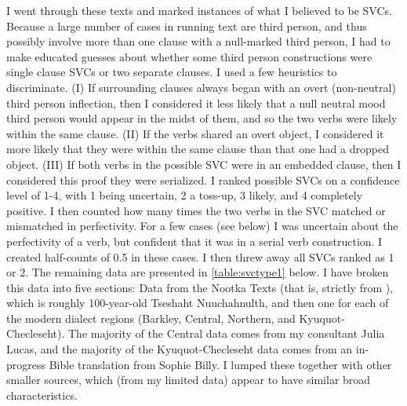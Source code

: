 I went through these texts and marked instances of what I believed to be SVCs. Because a large number of cases in running text are third person, and thus possibly involve more than one clause with a null-marked third person, I had to make educated guesses about whether some third person constructions were single clause SVCs or two separate clauses. I used a few heuristics to discriminate. (I) If surrounding clauses always began with an overt (non-neutral) third person inflection, then I considered it less likely that a null neutral mood third person would appear in the midst of them, and so the two verbs were likely within the same clause. (II) If the verbs shared an overt object, I considered it more likely that they were within the same clause than that one had a dropped object. (III) If both verbs in the possible SVC were in an embedded clause, then I considered this proof they were serialized. I ranked possible SVCs on a confidence level of 1-4, with 1 being uncertain, 2 a toss-up, 3 likely, and 4 completely positive. I then counted how many times the two verbs in the SVC matched or mismatched in perfectivity. For a few cases (see below) I was uncertain about the perfectivity of a verb, but confident that it was in a serial verb construction. I created half-counts of 0.5 in these cases. I then threw away all SVCs ranked as 1 or 2. The remaining data are presented in \cref{table:svctype1} below. I have broken this data into five sections: Data from the Nootka Texts (that is, strictly from \citealt{sapir1939}), which is roughly 100-year-old Tseshaht Nuuchahnulth, and then one for each of the modern dialect regions (Barkley, Central, Northern, and Kyuquot-Checleseht). The majority of the Central data comes from my consultant Julia Lucas, and the majority of the Kyuquot-Checleseht data comes from an in-progress Bible translation from Sophie Billy. I lumped these together with other smaller sources, which (from my limited data) appear to have similar broad characteristics.

\vspace{-10pt}

